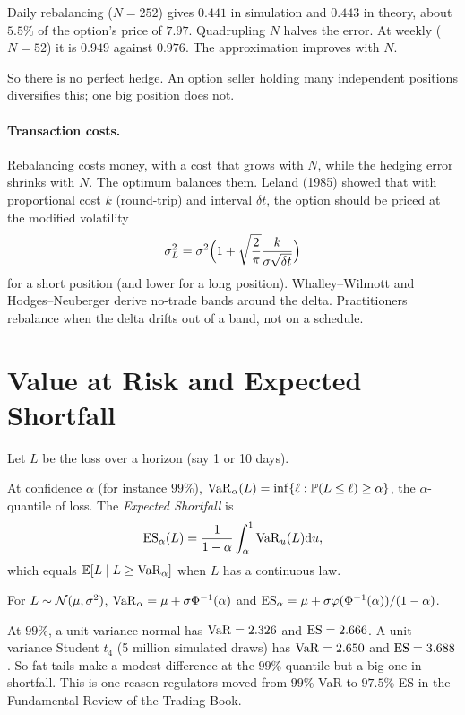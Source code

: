 \begin{numcheck}
Daily rebalancing ($N=252$) gives $0.441$ in simulation and $0.443$ in theory, about $5.5\%$ of the option's price of $7.97$. Quadrupling $N$ halves the error. At weekly ($N=52$) it is $0.949$ against $0.976$. The approximation improves with $N$.
\end{numcheck}

So there is no perfect hedge. An option seller holding many independent positions diversifies this; one big position does not.

\paragraph{Transaction costs.} Rebalancing costs money, with a cost that grows with $N$, while the hedging error shrinks with $N$. The optimum balances them. Leland (1985) showed that with proportional cost $k$ (round-trip) and interval $\delta t$, the option should be priced at the modified volatility
\[
\sigma_L^2=\sigma^2\Bigl(1+\sqrt{\frac{2}{\pi}}\frac{k}{\sigma\sqrt{\delta t}}\Bigr)
\]
for a short position (and lower for a long position). Whalley--Wilmott and Hodges--Neuberger derive no-trade bands around the delta. Practitioners rebalance when the delta drifts out of a band, not on a schedule.

\section{Value at Risk and Expected Shortfall}

Let $L$ be the loss over a horizon (say 1 or 10 days).
\begin{definition}
At confidence $\alpha$ (for instance $99\%$), $\operatorname{VaR}_\alpha(L)=\inf\{\ell:\mathbb{P}(L\le\ell)\ge\alpha\}$, the $\alpha$-quantile of loss. The \emph{Expected Shortfall} is
\[
\operatorname{ES}_\alpha(L)=\frac{1}{1-\alpha}\int_\alpha^1\operatorname{VaR}_u(L)\mathrm{d} u,
\]
which equals $\mathbb{E}[L\mid L\ge\operatorname{VaR}_\alpha]$ when $L$ has a continuous law.
\end{definition}

For $L\sim\mathcal{N}(\mu,\sigma^2)$, $\operatorname{VaR}_\alpha=\mu+\sigma\Phi^{-1}(\alpha)$ and $\operatorname{ES}_\alpha=\mu+\sigma\varphi(\Phi^{-1}(\alpha))/(1-\alpha)$.

\begin{numcheck}
At $99\%$, a unit variance normal has $\operatorname{VaR}=2.326$ and $\operatorname{ES}=2.666$. A unit-variance Student $t_4$ (5 million simulated draws) has $\operatorname{VaR}=2.650$ and $\operatorname{ES}=3.688$. So fat tails make a modest difference at the $99\%$ quantile but a big one in shortfall. This is one reason regulators moved from $99\%$ VaR to $97.5\%$ ES in the Fundamental Review of the Trading Book.
\end{numcheck}

